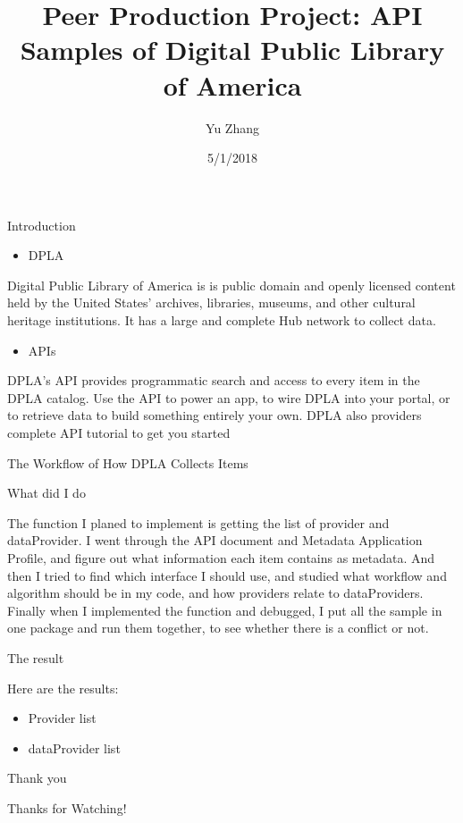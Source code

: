 \documentclass[ignorenonframetext,]{beamer}
\title{Peer Production Project: API Samples of Digital Public Library of
America}
\author{Yu Zhang}
\date{5/1/2018}
\providecommand{\tightlist}{%
  \setlength{\itemsep}{0pt}\setlength{\parskip}{0pt}}
\begin{document}
\frame{\titlepage}

\begin{frame}{Introduction}

\begin{itemize}
\tightlist
\item
  DPLA
\end{itemize}

Digital Public Library of America is is public domain and openly
licensed content held by the United States' archives, libraries,
museums, and other cultural heritage institutions. It has a large and
complete Hub network to collect data.

\begin{itemize}
\tightlist
\item
  APIs
\end{itemize}

DPLA's API provides programmatic search and access to every item in the
DPLA catalog. Use the API to power an app, to wire DPLA into your
portal, or to retrieve data to build something entirely your own. DPLA
also providers complete API tutorial to get you started

\end{frame}

\begin{frame}{The Workflow of How DPLA Collects Items}

\end{frame}

\begin{frame}{What did I do}

The function I planed to implement is getting the list of provider and
dataProvider. I went through the API document and Metadata Application
Profile, and figure out what information each item contains as metadata.
And then I tried to find which interface I should use, and studied what
workflow and algorithm should be in my code, and how providers relate to
dataProviders. Finally when I implemented the function and debugged, I
put all the sample in one package and run them together, to see whether
there is a conflict or not.

\end{frame}

\begin{frame}{The result}

Here are the results:

\begin{itemize}
\tightlist
\item
  Provider list
\end{itemize}

\begin{itemize}
\tightlist
\item
  dataProvider list
\end{itemize}

\end{frame}

\begin{frame}{Thank you}

Thanks for Watching!

\end{frame}
\end{document}
